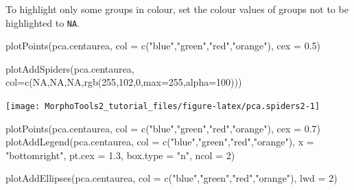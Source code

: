\documentclass[
  11pt,
  a4paper]{article}
\newenvironment{Shaded}{\begin{snugshade}}{\end{snugshade}}
\newcommand{\AttributeTok}[1]{\textcolor[rgb]{0.77,0.63,0.00}{#1}}
\newcommand{\ConstantTok}[1]{\textcolor[rgb]{0.00,0.00,0.00}{#1}}
\newcommand{\DecValTok}[1]{\textcolor[rgb]{0.00,0.00,0.81}{#1}}
\newcommand{\FloatTok}[1]{\textcolor[rgb]{0.00,0.00,0.81}{#1}}
\newcommand{\FunctionTok}[1]{\textcolor[rgb]{0.00,0.00,0.00}{#1}}
\newcommand{\NormalTok}[1]{#1}
\newcommand{\StringTok}[1]{\textcolor[rgb]{0.31,0.60,0.02}{#1}}
\begin{document}
To highlight only some groups in colour, set the colour values of groups
not to be highlighted to \texttt{NA}.

\begin{Shaded}
\begin{Highlighting}[]
\FunctionTok{plotPoints}\NormalTok{(pca.centaurea, }\AttributeTok{col =} \FunctionTok{c}\NormalTok{(}\StringTok{"blue"}\NormalTok{,}\StringTok{"green"}\NormalTok{,}\StringTok{"red"}\NormalTok{,}\StringTok{"orange"}\NormalTok{), }\AttributeTok{cex =} \FloatTok{0.5}\NormalTok{)}

\FunctionTok{plotAddSpiders}\NormalTok{(pca.centaurea, }\AttributeTok{col=}\FunctionTok{c}\NormalTok{(}\ConstantTok{NA}\NormalTok{,}\ConstantTok{NA}\NormalTok{,}\ConstantTok{NA}\NormalTok{,}\FunctionTok{rgb}\NormalTok{(}\DecValTok{255}\NormalTok{,}\DecValTok{102}\NormalTok{,}\DecValTok{0}\NormalTok{,}\AttributeTok{max=}\DecValTok{255}\NormalTok{,}\AttributeTok{alpha=}\DecValTok{100}\NormalTok{)))}
\end{Highlighting}
\end{Shaded}

\begin{center}\texttt{[image: MorphoTools2\_tutorial\_files/figure-latex/pca.spiders2-1]} \end{center}

\begin{Shaded}
\begin{Highlighting}[]
\FunctionTok{plotPoints}\NormalTok{(pca.centaurea, }\AttributeTok{col =} \FunctionTok{c}\NormalTok{(}\StringTok{"blue"}\NormalTok{,}\StringTok{"green"}\NormalTok{,}\StringTok{"red"}\NormalTok{,}\StringTok{"orange"}\NormalTok{), }\AttributeTok{cex =} \FloatTok{0.7}\NormalTok{)}
\FunctionTok{plotAddLegend}\NormalTok{(pca.centaurea, }\AttributeTok{col =} \FunctionTok{c}\NormalTok{(}\StringTok{"blue"}\NormalTok{,}\StringTok{"green"}\NormalTok{,}\StringTok{"red"}\NormalTok{,}\StringTok{"orange"}\NormalTok{), }
               \AttributeTok{x =} \StringTok{"bottomright"}\NormalTok{, }\AttributeTok{pt.cex =} \FloatTok{1.3}\NormalTok{, }\AttributeTok{box.type =} \StringTok{"n"}\NormalTok{, }\AttributeTok{ncol =} \DecValTok{2}\NormalTok{)}

\FunctionTok{plotAddEllipses}\NormalTok{(pca.centaurea, }\AttributeTok{col =} \FunctionTok{c}\NormalTok{(}\StringTok{"blue"}\NormalTok{,}\StringTok{"green"}\NormalTok{,}\StringTok{"red"}\NormalTok{,}\StringTok{"orange"}\NormalTok{), }\AttributeTok{lwd =} \DecValTok{2}\NormalTok{)}
\end{Highlighting}
\end{Shaded}
\end{document}
